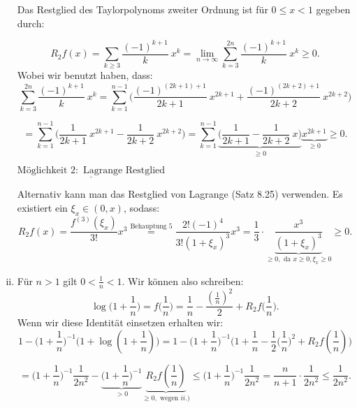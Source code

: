 \documentclass[a4paper, 20]{exam}
\begin{document}
\begin{solution}
\begin{enumerate}[i.)]
Das Restglied des Taylorpolynoms zweiter Ordnung ist f\"ur $0\leq x < 1$ gegeben durch:

$$ R_2 f(x) = \sum_{k\geq 3} \frac{(-1)^{k+1}}{k} \ x^k 
=\lim_{n \rightarrow \infty} \sum_{k=3}^{2n} \frac{(-1)^{k+1}}{k} \ x^k \geq 0.$$
Wobei wir benutzt haben, dass:
$$ \sum_{k=3}^{2n} \frac{(-1)^{k+1}}{k} \ x^k 
= \sum_{k=1}^{n-1} \bigg(\frac{(-1)^{(2k+1)+1}}{2k+1} \ x^{2k+1} + \frac{(-1)^{(2k+2)+1}}{2k+2} \ x^{2k+2}\bigg)$$

$$= \sum_{k=1}^{n-1} \bigg(\frac{1}{2k+1} \ x^{2k+1} - \frac{1}{2k+2} \ x^{2k+2}\bigg) 
= \sum_{k=1}^{n-1} \underbrace{\bigg(\frac{1}{2k+1}  - \frac{1}{2k+2} \ x\bigg)}_{\geq 0} \underbrace{ x^{2k+1}}_{\geq 0} \geq 0.$$

$\underline{\text{M\"oglichkeit } 2: \text{ Lagrange Restglied}}$

Alternativ kann man das Restglied von Lagrange (Satz 8.25) verwenden. Es existiert ein $\xi_x \in (0,x)$, sodass:
$$ R_2f(x) = \frac{f^{(3)}(\xi_x)}{3!}x^3 
\stackrel{\text{Behauptung 5}}{=} \frac{2!(-1)^4}{3!(1+\xi_x)^3}x^3
= \frac{1}{3} \cdot \underbrace{\frac{x^3}{(1+\xi_x)^3}}_{\geq 0, \text{ da } x\geq 0 ,\xi_x\geq 0} \geq 0.$$
\item
F\"ur $n>1$ gilt $0<\frac{1}{n} <1$. Wir k\"onnen also schreiben:
$$ \log\bigg(1+\frac{1}{n}\bigg) = f\bigg(\frac{1}{n}\bigg) = \frac{1}{n} - \frac{\left( \frac{1}{n} \right)^2}{2} + R_2 f\bigg(\frac{1}{n}\bigg).$$
Wenn wir diese Identit\"at einsetzen erhalten wir:
$$ 1 - \bigg(1+\frac{1}{n}\bigg)^{-1}\bigg(1+ \log(1+\frac{1}{n})\bigg) 
= 1 - \bigg(1+\frac{1}{n}\bigg)^{-1}\bigg(1+ \frac{1}{n} - \frac{1}{2}\big(\frac{1}{n}\big)^2 + R_2f(\frac{1}{n})\bigg)  $$

$$= \bigg(1+\frac{1}{n}\bigg)^{-1} \frac{1}{2n^2} - 
\underbrace{\bigg(1+\frac{1}{n}\bigg)^{-1}}_{> 0} \underbrace{R_2 f(\frac{1}{n})}_{\geq 0, \text{ wegen } ii.)}  
\leq \bigg(1+\frac{1}{n}\bigg)^{-1} \frac{1}{2n^2} = \frac{n}{n+1} \cdot \frac{1}{2n^2}
\leq \frac{1}{2n^2}.$$
\end{enumerate}
\end{solution}
\end{document}
